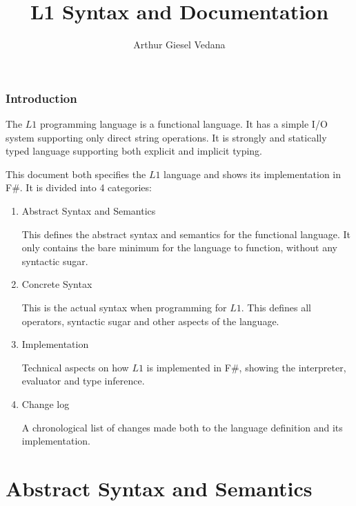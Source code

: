 \documentclass{report}
\author{Arthur Giesel Vedana}
\title{L1 Syntax and Documentation}
\begin{document}
\maketitle
{}
\newpage

\tableofcontents
\newpage

\section*{Introduction}
The $L1$ programming language is a functional language.
It has a simple I/O system supporting only direct string operations. 
It is strongly and statically typed language supporting both explicit and implicit typing.

This document both specifies the $L1$ language and shows its implementation in F\#.
It is divided into 4 categories:
\begin{enumerate}
	\item Abstract Syntax and Semantics
	
		This defines the abstract syntax and semantics for the functional language.
		It only contains the bare minimum for the language to function, without any syntactic sugar. 
	\item Concrete Syntax
	
		This is the actual syntax when programming for $L1$.
		This defines all operators, syntactic sugar and other aspects of the language.
	\item Implementation
	
		Technical aspects on how $L1$ is implemented in F\#, showing the interpreter, evaluator and type inference.
	\item Change log
	
		A chronological list of changes made both to the language definition and its implementation.
\end{enumerate}

\newpage
{}
\part{Abstract Syntax and Semantics}
\end{document}
